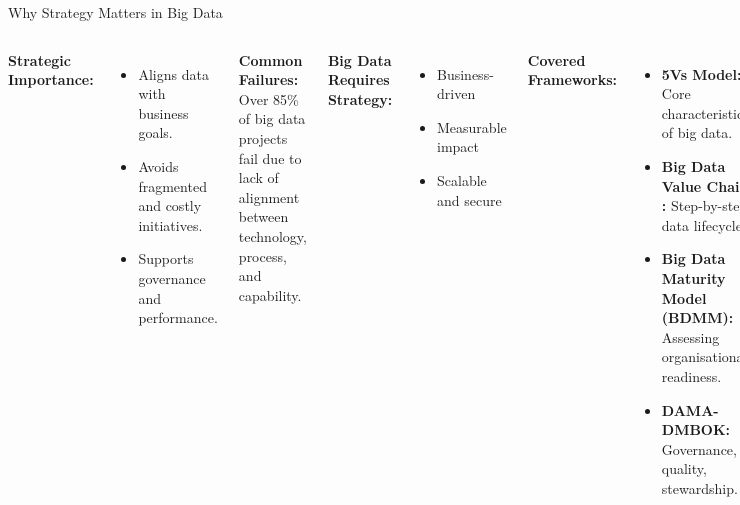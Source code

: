 \documentclass[aspectratio=169, table]{beamer}
\begin{document}
	\begin{frame}[fragile]{Why Strategy Matters in Big Data}
		\vspace{20pt}
		\small
		\begin{columns}[T]
			\textbf{Strategic Importance:}
			\begin{itemize}
				\item Aligns data with business goals.
				\item Avoids fragmented and costly initiatives.
				\item Supports governance and performance.
			\end{itemize}
			
			\textbf{Common Failures:} Over 85\% of big data projects fail due to lack of alignment between technology, process, and capability.
			
			
			\vspace{5pt}
			\textbf{Big Data Requires Strategy:}
			\begin{itemize}
				\item Business-driven
				\item Measurable impact
				\item Scalable and secure
			\end{itemize}
			
			\textbf{Covered Frameworks:}
			\begin{itemize}
				\item \textbf{5Vs Model:} Core characteristics of big data.
				\item \textbf{Big Data Value Chain :} Step-by-step data lifecycle.
				\item \textbf{Big Data Maturity Model (BDMM):} Assessing organisational readiness.
				\item \textbf{DAMA-DMBOK:} Governance, quality, stewardship.
			\end{itemize}
			
			\textbf{Strategic Outcome:}  
			Big data strategy bridges vision and execution, supporting digital transformation and data-driven decision-making.
		\end{columns}
	\end{frame}
	
\end{document}

